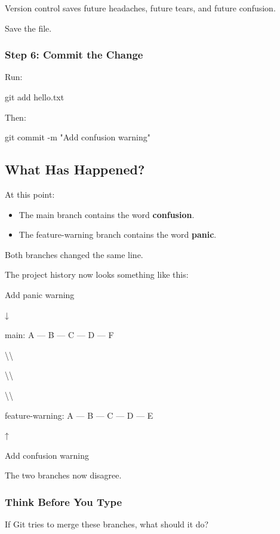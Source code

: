 \documentclass{csc2059practical}
\begin{document}
\begin{terminalplain}
Version control saves future headaches, future tears, and future confusion.
\end{terminalplain}
Save the file.

\subsubsection{Step 6: Commit the Change}
Run:

\begin{terminalplain}
git add hello.txt
\end{terminalplain}
Then:

\begin{terminalplain}
git commit -m "Add confusion warning"
\end{terminalplain}
\subsection{What Has Happened?}
At this point:

\begin{itemize}
  \item The main branch contains the word \textbf{confusion}.
  \item The feature-warning branch contains the word \textbf{panic}.
\end{itemize}
Both branches changed the same line.

The project history now looks something like this:

Add panic warning

↓

\begin{terminalplain}
main: A --- B --- C --- D --- F
\end{terminalplain}
\textbackslash{}\textbackslash{}

\textbackslash{}\textbackslash{}

\textbackslash{}\textbackslash{}

\begin{terminalplain}
feature-warning: A --- B --- C --- D --- E
\end{terminalplain}
↑

Add confusion warning

The two branches now disagree.

\subsubsection{Think Before You Type}
If Git tries to merge these branches, what should it do?
\end{document}
